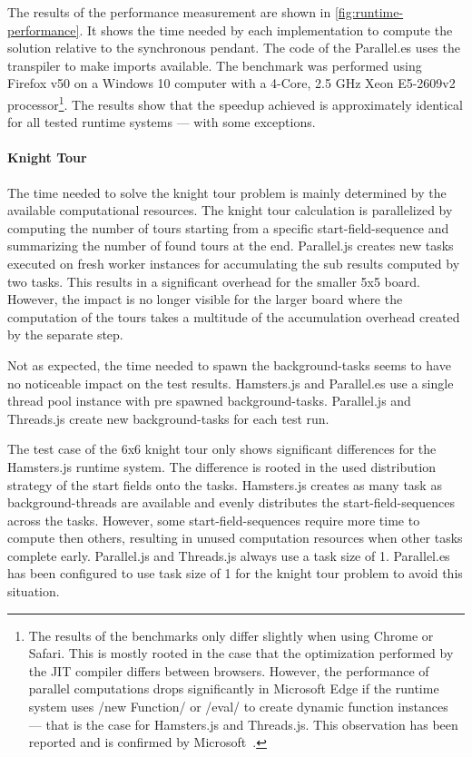 The results of the performance measurement are shown in \cref{fig:runtime-performance}. It shows the time needed by each implementation to compute the solution relative to the synchronous pendant. The code of the Parallel.es uses the transpiler to make imports available. The benchmark was performed using Firefox v50 on a Windows 10 computer with a 4-Core, 2.5 GHz Xeon E5-2609v2 processor\footnote{The results of the benchmarks only differ slightly when using Chrome or Safari. This is mostly rooted in the case that the optimization performed by the JIT compiler differs between browsers. However, the performance of parallel computations drops significantly in Microsoft Edge if the runtime system uses \javascriptinline/new Function/ or \javascriptinline/eval/ to create dynamic function instances --- that is the case for Hamsters.js and Threads.js. This observation has been reported and is confirmed by Microsoft~\cite{newFunctionWebWorkerEdge}.}. The results show that the speedup achieved is approximately identical for all tested runtime systems --- with some exceptions. 

\paragraph{Knight Tour} The time needed to solve the knight tour problem is mainly determined by the available computational resources. The knight tour calculation is parallelized by computing the number of tours starting from a specific start-field-sequence and summarizing the  number of found tours at the end. Parallel.js creates new tasks executed on fresh worker instances for accumulating the sub results computed by two tasks. This results in a significant overhead for the smaller 5x5 board. However, the impact is no longer visible for the larger board where the computation of the tours takes a multitude of the accumulation overhead created by the separate step. 

Not as expected, the time needed to spawn the background-tasks seems to have no noticeable impact on the test results. Hamsters.js and Parallel.es use a single thread pool instance with pre spawned background-tasks. Parallel.js and Threads.js create new background-tasks for each test run.

The test case of the 6x6 knight tour only shows significant differences for the Hamsters.js runtime system. The difference is rooted in the used distribution strategy of the start fields onto the tasks. Hamsters.js creates as many task as background-threads are available and evenly distributes the start-field-sequences across the tasks. However, some start-field-sequences require more time to compute then others, resulting in unused computation resources when other tasks complete early. Parallel.js and Threads.js always use a task size of 1. Parallel.es has been configured to use task size of 1 for the knight tour problem to avoid this situation.

